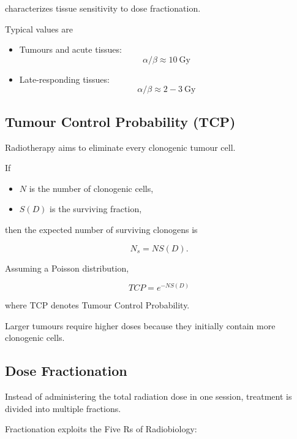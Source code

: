 \documentclass[12pt]{article}
\begin{document}
characterizes tissue sensitivity to dose fractionation.

Typical values are

\begin{itemize}
\item Tumours and acute tissues:
\[
\alpha/\beta \approx 10~\mathrm{Gy}
\]

\item Late-responding tissues:
\[
\alpha/\beta \approx 2-3~\mathrm{Gy}
\]
\end{itemize}


\subsection{Tumour Control Probability (TCP)}

Radiotherapy aims to eliminate every clonogenic tumour cell.

If

\begin{itemize}
\item $N$ is the number of clonogenic cells,
\item $S(D)$ is the surviving fraction,
\end{itemize}

then the expected number of surviving clonogens is

\begin{equation}
N_s=NS(D).
\end{equation}

Assuming a Poisson distribution,

\begin{equation}
\boxed{
TCP=e^{-NS(D)}
}
\end{equation}

where TCP denotes Tumour Control Probability.

Larger tumours require higher doses because they initially contain more clonogenic cells.


\subsection{Dose Fractionation}

Instead of administering the total radiation dose in one session, treatment is divided into multiple fractions.

Fractionation exploits the Five Rs of Radiobiology:
\end{document}
